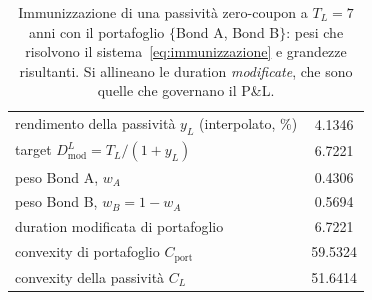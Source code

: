 \begin{table}[H]\centering\small
\caption{Immunizzazione di una passivit\`a zero-coupon a $T_L=7$ anni con il portafoglio $\{$Bond A, Bond B$\}$: pesi che risolvono il sistema~\eqref{eq:immunizzazione} e grandezze risultanti. Si allineano le duration \emph{modificate}, che sono quelle che governano il P\&L.}
\label{tab:immunizzazione}\renewcommand{\arraystretch}{1.15}
\begin{tabular}{lc}
\toprule
\rowcolor{rowtint}rendimento della passivit\`a $y_L$ (interpolato, \%) & 4.1346\\
target $D_{\mathrm{mod}}^{L} = T_L/(1+y_L)$ & 6.7221\\
\rowcolor{rowtint}peso Bond A, $w_A$ & 0.4306\\
peso Bond B, $w_B=1-w_A$ & 0.5694\\
\rowcolor{rowtint}duration modificata di portafoglio & 6.7221\\
convexity di portafoglio $C_{\mathrm{port}}$ & 59.5324\\
\rowcolor{rowtint}convexity della passivit\`a $C_L$ & 51.6414\\
\bottomrule
\end{tabular}
\end{table}
